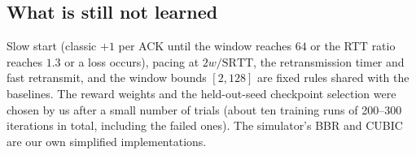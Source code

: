 \subsection{What is still not learned}
\label{sec:truesmart-lim}
Slow start (classic $+1$ per ACK until the window reaches $64$ or the RTT ratio reaches $1.3$ or a loss occurs), pacing at $2w/\mathrm{SRTT}$, the retransmission timer and fast retransmit, and the window bounds $[2,128]$ are fixed rules shared with the baselines. The reward weights and the held-out-seed checkpoint selection were chosen by us after a small number of trials (about ten training runs of 200--300 iterations in total, including the failed ones). The simulator's BBR and CUBIC are our own simplified implementations.
